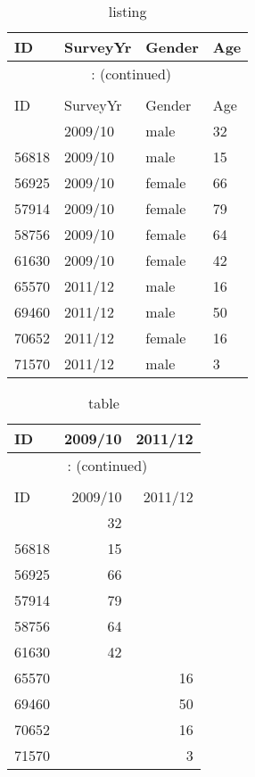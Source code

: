 \documentclass{article}
\begin{document}
\hypertarget{listing}{} 
\begingroup\footnotesize\begin{longtable}{llll}
\caption{listing}\\
\toprule
ID & SurveyYr & Gender & Age\\
\hline
\endfirsthead
\multicolumn{4}{c}{\tablename~\thetable{}: (continued)}\\\\
\toprule
ID & SurveyYr & Gender & Age\\
\hline
\endhead \hline \endfoot \hline
\endlastfoot
55460 & 2009/10 & male & 32 \\
56818 & 2009/10 & male & 15 \\
56925 & 2009/10 & female & 66 \\
57914 & 2009/10 & female & 79 \\
58756 & 2009/10 & female & 64 \\
61630 & 2009/10 & female & 42 \\
65570 & 2011/12 & male & 16 \\
69460 & 2011/12 & male & 50 \\
70652 & 2011/12 & female & 16 \\
71570 & 2011/12 & male &  3 \\
\end{longtable}

\endgroup
\newpage
\hypertarget{table}{} 
\begingroup\footnotesize\begin{longtable}{lrr}
\caption{table}\\
\toprule
ID & 2009/10 & 2011/12 \\
\hline
\endfirsthead
\multicolumn{3}{c}{\tablename~\thetable{}: (continued)}\\\\
\toprule
ID & 2009/10 & 2011/12 \\
\hline
\endhead \hline \endfoot \hline
\endlastfoot
55460 & 32 &  \\
56818 & 15 &  \\
56925 & 66 &  \\
57914 & 79 &  \\
58756 & 64 &  \\
61630 & 42 &  \\
65570 &  & 16 \\
69460 &  & 50 \\
70652 &  & 16 \\
71570 &  & 3 \\
\end{longtable}
\end{document}
